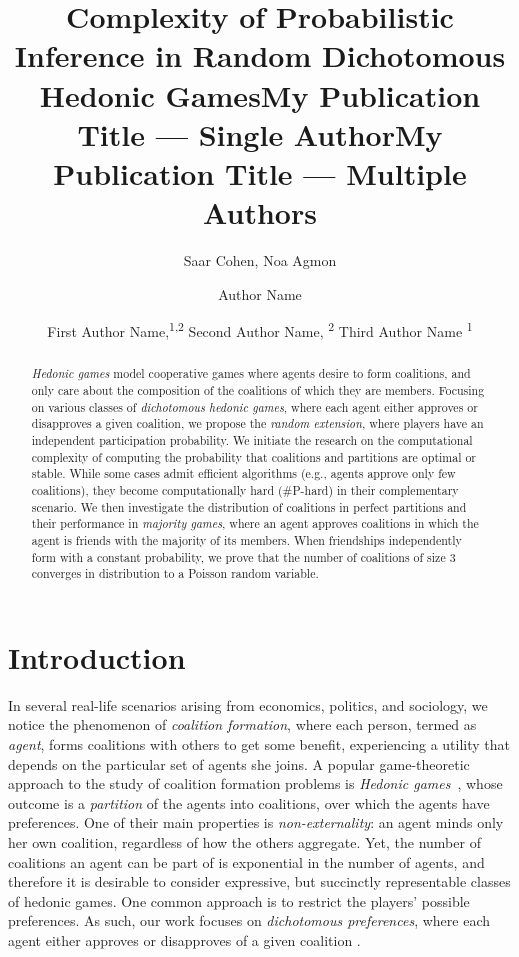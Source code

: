 \documentclass[letterpaper]{article} %
\title{Complexity of Probabilistic Inference in Random Dichotomous Hedonic Games}
\author{
    Saar Cohen,
    Noa Agmon
}
\title{My Publication Title --- Single Author}
\author {
    Author Name
}
\title{My Publication Title --- Multiple Authors}
\author {
    First Author Name,\textsuperscript{\rm 1,\rm 2}
    Second Author Name, \textsuperscript{\rm 2}
    Third Author Name \textsuperscript{\rm 1}
}
\begin{document}
\maketitle

\begin{abstract}
\textit{Hedonic games} model cooperative games where agents desire to form coalitions, and only care about the composition of the coalitions of which they are members. %
Focusing on various classes of \textit{dichotomous hedonic games}, where each agent either approves or disapproves a given coalition, we propose the \textit{random extension}, where players have an independent participation probability. We initiate the research on the computational complexity of computing the probability that coalitions and partitions are optimal or stable. While some cases admit efficient algorithms (e.g., agents approve only few coalitions), they become computationally hard (\#P-hard) in their complementary scenario. We then investigate the distribution of coalitions in perfect partitions and their performance in \textit{majority games}, where an agent approves coalitions in which the agent is friends with the majority of its members. When friendships independently form with a constant probability, we prove that the number of coalitions of size $3$ converges in distribution to a Poisson random variable.
\end{abstract}

\section{Introduction}
\label{sec:Introduction}
In several real-life scenarios arising from economics, politics, and sociology, we notice the phenomenon of \textit{coalition formation}, where each person, termed as \textit{agent}, forms coalitions with others to get some benefit, experiencing a utility that depends on the particular set of agents she joins. A popular game-theoretic approach to the study of coalition formation problems is \textit{Hedonic games}~\cite{dreze1980hedonic}, whose outcome is a \textit{partition} of the agents into coalitions, over which the agents have preferences. One of their main properties is \textit{non-externality}: an agent minds only her own coalition, regardless of how the others aggregate. Yet, the number of coalitions an agent can be part of is exponential in the number of agents, and therefore it is desirable to consider expressive, but succinctly representable classes of hedonic games. One common approach is to restrict the players' possible preferences. As such, our work focuses on \textit{dichotomous preferences}, where each agent either approves or disapproves of a given coalition \cite{aziz2016boolean}. %
%
\end{document}
